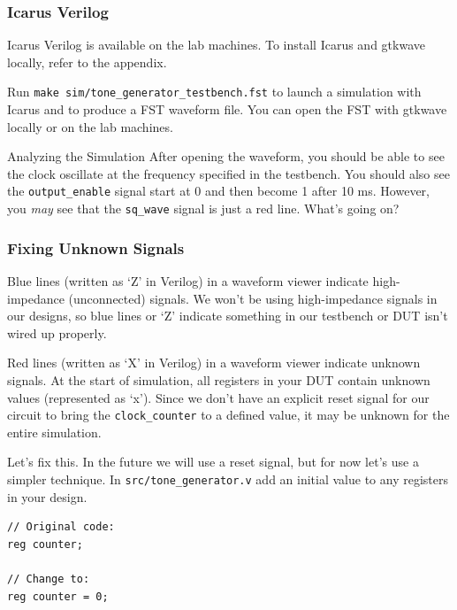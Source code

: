\documentclass[11pt]{article}
\makeatletter
\renewcommand{\subsection}
{\@startsection {subsection}{1}{0pt}
 {-1ex}
 {0.5ex}
 {\bfseries\normalsize}}
\makeatother
\begin{document}
\subsubsection{Icarus Verilog}
Icarus Verilog is available on the lab machines.
To install Icarus and gtkwave locally, refer to the appendix.

Run \verb|make sim/tone_generator_testbench.fst| to launch a simulation with Icarus and to produce a FST waveform file.
You can open the FST with gtkwave locally or on the lab machines.

\subsection{Analyzing the Simulation}
After opening the waveform, you should be able to see the clock oscillate at the frequency specified in the testbench.
You should also see the \verb|output_enable| signal start at 0 and then become 1 after 10 ms.
However, you \textit{may} see that the \verb|sq_wave| signal is just a red line. What's going on?

\subsubsection{Fixing Unknown Signals}
Blue lines (written as `Z' in Verilog) in a waveform viewer indicate high-impedance (unconnected) signals.
We won't be using high-impedance signals in our designs, so blue lines or `Z' indicate something in our testbench or DUT isn't wired up properly.

Red lines (written as `X' in Verilog) in a waveform viewer indicate unknown signals.
At the start of simulation, all registers in your DUT contain unknown values (represented as `x').
Since we don't have an explicit reset signal for our circuit to bring the \verb|clock_counter| to a defined value, it may be unknown for the entire simulation.

Let's fix this. In the future we will use a reset signal, but for now let's use a simpler technique. In \verb|src/tone_generator.v| add an initial value to any registers in your design.
\begin{verbatim}
// Original code:
reg counter;

// Change to:
reg counter = 0;
\end{verbatim}
\end{document}
